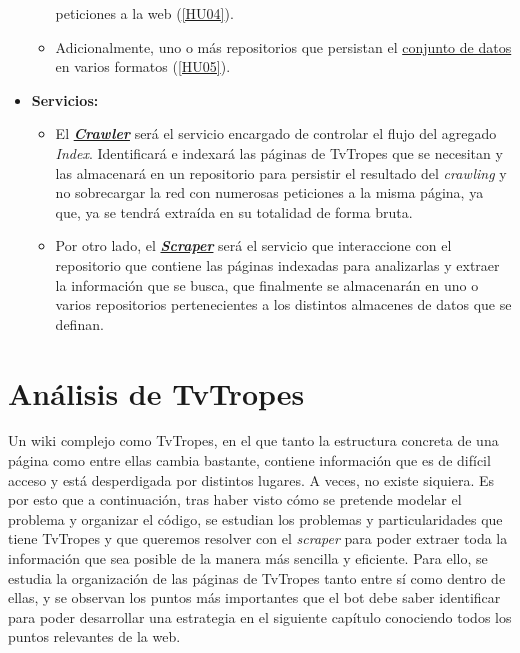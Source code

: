 \begin{itemize}
\begin{itemize}
    peticiones a la web
    (\href{https://github.com/jlgallego99/TropesToGo/issues/9}{[HU04]}).
    \item Adicionalmente, uno o más repositorios que persistan el
    \href{https://github.com/jlgallego99/TropesToGo/blob/master/tropestogo/media/repository.go}{conjunto
    de datos} en varios formatos
    (\href{https://github.com/jlgallego99/TropesToGo/issues/30}{[HU05]}).
  \end{itemize}
  \item \textbf{Servicios:}
  \begin{itemize}
    \item El
    \textbf{\href{https://github.com/jlgallego99/TropesToGo/blob/master/tropestogo/service/crawler/crawler.go}{\textit{Crawler}}}
    será el servicio encargado de controlar el flujo del agregado
    \textit{Index}. Identificará e indexará las páginas de TvTropes que se
    necesitan y las almacenará en un repositorio para persistir el resultado del
    \textit{crawling} y no sobrecargar la red con numerosas peticiones a la
    misma página, ya que, ya se tendrá extraída en su totalidad de forma bruta.
    \item Por otro lado, el
    \textbf{\href{https://github.com/jlgallego99/TropesToGo/blob/master/tropestogo/service/scraper/scraper.go}{\textit{Scraper}}}
    será el servicio que interaccione con el repositorio que contiene las
    páginas indexadas para analizarlas y extraer la información que se busca,
    que finalmente se almacenarán en uno o varios repositorios pertenecientes a
    los distintos almacenes de datos que se definan. 
  \end{itemize}
\end{itemize}

\section{Análisis de TvTropes}
Un wiki complejo como TvTropes, en el que tanto la estructura concreta de una
página como entre ellas cambia bastante, contiene información que es de difícil
acceso y está desperdigada por distintos lugares. A veces, no existe siquiera.
Es por esto que a continuación, tras haber visto cómo se pretende modelar el
problema y organizar el código, se estudian los problemas y particularidades que
tiene TvTropes y que queremos resolver con el \textit{scraper} para poder
extraer toda la información que sea posible de la manera más sencilla y
eficiente. Para ello, se estudia la organización de las páginas de TvTropes
tanto entre sí como dentro de ellas, y se observan los puntos más importantes
que el bot debe saber identificar para poder desarrollar una estrategia en el
siguiente capítulo conociendo todos los puntos relevantes de la web.

